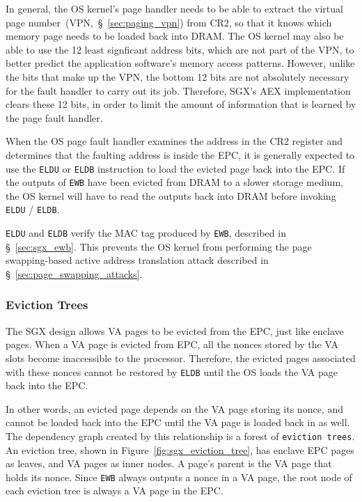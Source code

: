 In general, the OS kernel's page handler needs to be able to extract the
virtual page number~(VPN,~\S~\ref{sec:paging_vpn}) from CR2, so that it knows
which memory page needs to be loaded back into DRAM. The OS kernel may also be
able to use the 12 least signficant address bits, which are not part of the
VPN, to better predict the application software's memory access patterns.
However, unlike the bits that make up the VPN, the bottom 12 bits are not
absolutely necessary for the fault handler to carry out its job. Therefore,
SGX's AEX implementation clears these 12 bits, in order to limit the amount of
information that is learned by the page fault handler.


When the OS page fault handler examines the address in the CR2 register and
determines that the faulting address is inside the EPC, it is generally
expected to use the \texttt{ELDU} or \texttt{ELDB} instruction to load the
evicted page back into the EPC. If the outputs of \texttt{EWB} have been
evicted from DRAM to a slower storage medium, the OS kernel will have to read
the outputs back into DRAM before invoking \texttt{ELDU} / \texttt{ELDB}.

\texttt{ELDU} and \texttt{ELDB} verify the MAC tag produced by \texttt{EWB},
described in \S~\ref{sec:sgx_ewb}. This prevents the OS kernel from performing
the page swapping-based active address translation attack described in
\S~\ref{sec:page_swapping_attacks}.


\subsubsection{Eviction Trees}
\label{sec:sgx_eviction_trees}

The SGX design allows VA pages to be evicted from the EPC, just like enclave
pages. When a VA page is evicted from EPC, all the nonces stored by the VA
slots become inaccessible to the processor. Therefore, the evicted pages
associated with these nonces cannot be restored by \texttt{ELDB} until the
OS loads the VA page back into the EPC.

In other words, an evicted page depends on the VA page storing its nonce, and
cannot be loaded back into the EPC until the VA page is loaded back in as well.
The dependency graph created by this relationship is a forest of
\texttt{eviction trees}. An eviction tree, shown in
Figure~\ref{fig:sgx_eviction_tree}, has enclave EPC pages as leaves, and VA
pages as inner nodes. A page's parent is the VA page that holds its nonce.
Since \texttt{EWB} always outputs a nonce in a VA page, the root node of each
eviction tree is always a VA page in the EPC.

